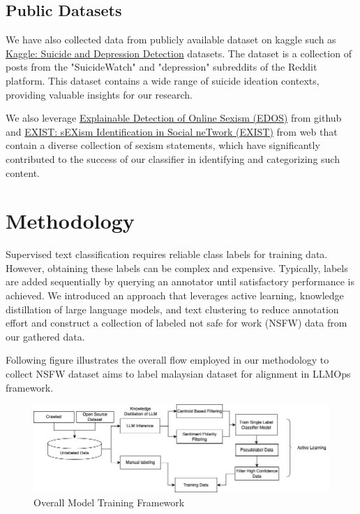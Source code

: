 \documentclass[preprint]{article}
\begin{document}
\subsection{Public Datasets}

We have also collected data from publicly available dataset on kaggle such as \href{https://www.kaggle.com/datasets/nikhileswarkomati/suicide-watch}{Kaggle: Suicide and Depression Detection} datasets. The dataset is a collection of posts from the "SuicideWatch" and "depression" subreddits of the Reddit platform. This dataset contains a wide range of suicide ideation contexts, providing valuable insights for our research.

We also leverage \href{https://github.com/rewire-online/edos}{Explainable Detection of Online Sexism (EDOS)} from github and \href{http://nlp.uned.es/exist2021/}{EXIST: sEXism Identification in Social neTwork (EXIST)} from web that contain a diverse collection of sexism statements, which have significantly contributed to the success of our classifier in identifying and categorizing such content.

\section{Methodology}

Supervised text classification requires reliable class labels for training data. However, obtaining these labels can be complex and expensive. Typically, labels are added sequentially by querying an annotator until satisfactory performance is achieved. We introduced an approach that leverages active learning, knowledge distillation of large language models, and text clustering to reduce annotation effort and construct a collection of labeled not safe for work (NSFW) data from our gathered data.

Following figure illustrates the overall flow employed in our methodology to collect NSFW dataset aims to label malaysian dataset for alignment in LLMOps framework.

\begin{figure}[h]
  \centering
  \includegraphics[width=0.6\linewidth]{img/flow-sfw.png}
  \caption{Overall Model Training Framework}
\end{figure}
\end{document}
